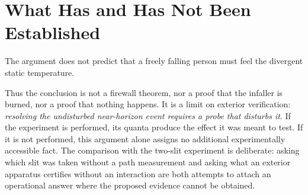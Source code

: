 \enlargethispage{2\baselineskip}
\section{What Has and Has Not Been Established}

The argument does not predict that a freely falling person must feel the divergent static temperature.

\begin{classroomqa}
\end{classroomqa}

Thus the conclusion is not a firewall theorem, nor a proof that the infaller is burned, nor a proof that nothing happens. It is a limit on exterior verification: \emph{resolving the undisturbed near-horizon event requires a probe that disturbs it}.
If the experiment is performed, its quanta produce the effect it was meant to test. If it is not performed, this argument alone assigns no additional experimentally accessible fact. The comparison with the two-slit experiment is deliberate: asking which slit was taken without a path measurement and asking what an exterior apparatus certifies without an interaction are both attempts to attach an operational answer where the proposed evidence cannot be obtained.
